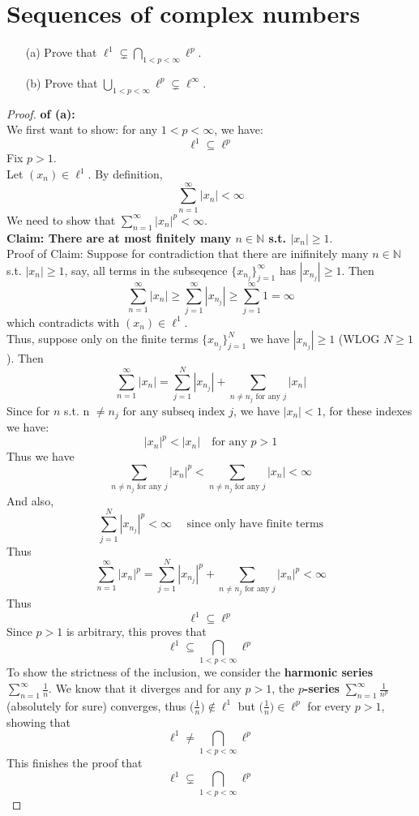 \documentclass[lang=cn,11pt]{elegantbook}
\begin{document}
\section{Sequences of complex numbers}
  \begin{itemize}
  \item[(a)]
    Prove that $\ell^1\subsetneq\bigcap_{1<p<\infty}\ell^p$.
  \item[(b)]
    Prove that $\bigcup_{1<p<\infty}\ell^p\subsetneq\ell^\infty$.
  \end{itemize}
    
\begin{proof}
    \textbf{of (a):}\\
We first want to show: for any \(1 < p < \infty\), we have: \[
\ell^1 \subseteq \ell^p
\]
Fix $p>1$.\\
Let \((x_n) \in \ell^1\). By definition, 
\[
  \sum_{n=1}^{\infty} |x_n| < \infty
\]
We need to show that \(\sum_{n=1}^\infty |x_n|^p < \infty\).\\
\textbf{Claim: There are at most finitely many $n\in \mathbb{N}$ s.t. $|x_n| \geq 1$}.\\
Proof of Claim: Suppose for contradiction that there are inifinitely many $n\in \mathbb{N}$ s.t. $|x_n| \geq 1$, say, all terms in the subseqence $\{x_{n_j}\}_{j=1}^\infty$ has $|x_{n_j}|\geq 1$. Then \[
\sum_{n=1}^{\infty} |x_n| \geq \sum_{j=1}^{\infty} |x_{n_j}|\geq \sum_{j=1}^{\infty} 1 = \infty
\]which contradicts with \((x_n) \in \ell^1\).\\
Thus, suppose only on the finite terms $\{x_{n_j}\}_{j=1}^N$ we have $|x_{n_j}|\geq 1$ (WLOG $N\geq 1$). Then
\[
\sum_{n=1}^{\infty} |x_n| =\sum_{j=1}^{N} |x_{n_j}| + \sum_{n \not = n_j \text{ for any }j} |x_n|
\]
Since for $n$ s.t. n $\not = n_j \text{ for any subseq index }j$, we have $|x_n| <1$, for these indexes we have: \[
|x_n|^p < |x_n| \quad \text{for any } p >1
\] Thus we have \[
\sum_{n \not = n_j \text{ for any }j} |x_n|^p  < \sum_{n \not = n_j \text{ for any }j} |x_n| < \infty
\]
And also, \[
\sum_{j=1}^{N} |x_{n_j}|^p < \infty \quad \text{ since only have finite terms}
\]
Thus \[
\sum_{n=1}^{\infty} |x_n|^p =\sum_{j=1}^{N} |x_{n_j}|^p + \sum_{n \not = n_j \text{ for any }j} |x_n|^p < \infty
\]
Thus \[
\ell^1 \subseteq \ell^p
\]
Since $p>1$ is arbitrary, this proves that
\[
   \ell^1 \subseteq \bigcap_{1<p<\infty}\ell^p
\]
To show the strictness of the inclusion, we consider the \textbf{harmonic series} \(\sum_{n=1}^\infty \frac{1}{n}\). We know that it diverges and for any \(p>1\), the \textbf{\(p\)-series} \(\sum_{n=1}^\infty \frac{1}{n^p}\) (absolutely for sure) converges, thus  \(\bigl(\tfrac{1}{n}\bigr) \notin \ell^1\) but \(\bigl(\tfrac{1}{n}\bigr) \in \ell^p\) for every \(p>1\), showing that \[
   \ell^1 \not= \bigcap_{1<p<\infty}\ell^p
\]This finishes the proof that 
\[
   \ell^1 \subsetneq \bigcap_{1<p<\infty}\ell^p
\]
\end{proof}
\end{document}
